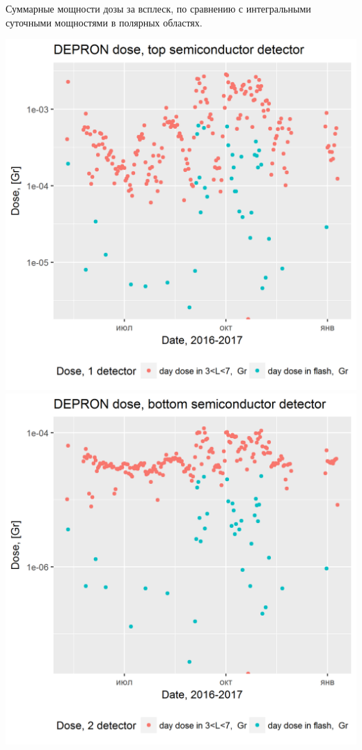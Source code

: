 \documentclass[t, aspectratio=43]{beamer}
\begin{document}
\begin{frame}	
\frametitle{\insertsection} 
{\tiny Суммарные мощности дозы за всплеск, по сравнению с интегральными суточными мощностями в полярных областях. }


\begin{center}
	\includegraphics[width=0.5\linewidth]{images/ressumdosepolarflash1sci}
	\includegraphics[width=0.5\linewidth]{images/ressumdosepolarflash2sci}
\end{center}


\end{frame}
\end{document}
